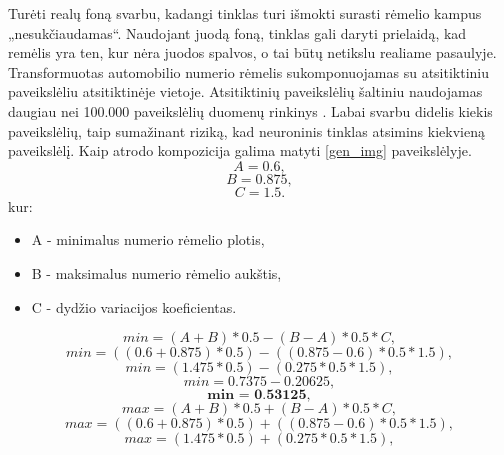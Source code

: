 \documentclass{VUMIFInfBakalaurinis}
\begin{document}
Turėti realų foną svarbu, kadangi tinklas turi išmokti surasti rėmelio kampus „nesukčiaudamas“. 
Naudojant juodą foną, tinklas gali daryti prielaidą, kad remėlis yra ten, kur nėra juodos spalvos, o tai būtų netikslu realiame pasaulyje.
Transformuotas automobilio numerio rėmelis sukomponuojamas su atsitiktiniu paveikslėliu atsitiktinėje vietoje.
Atsitiktinių paveikslėlių šaltiniu naudojamas daugiau nei 100.000 paveikslėlių duomenų rinkinys \cite{xiao2010sun}.
Labai svarbu didelis kiekis paveikslėlių, taip sumažinant riziką, kad neuroninis tinklas atsimins kiekvieną paveikslėlį.
Kaip atrodo kompozicija galima matyti \ref{gen_img} paveikslėlyje.
\begin{equation}
  A = 0.6,
\end{equation}
\begin{equation}
  B = 0.875,
\end{equation}
\begin{equation}
  C = 1.5.
\end{equation}
kur:
\begin{itemize}[itemsep=0.5pt]
  \item A - minimalus numerio rėmelio plotis,
  \item B - maksimalus numerio rėmelio aukštis,
  \item C - dydžio variacijos koeficientas.
\end{itemize}
\begin{equation}
  min = (A + B) * 0.5 - (B - A) * 0.5 * C,
\end{equation}
\begin{equation}
  min = ((0.6 + 0.875) * 0.5) - ((0.875 - 0.6) * 0.5 * 1.5),
\end{equation}
\begin{equation}
  min = (1.475 * 0.5) - (0.275 * 0.5 * 1.5),
\end{equation}
\begin{equation}
  min = 0.7375 - 0.20625,
\end{equation}
\begin{equation}
  \textbf{min = 0.53125},
\end{equation}
\begin{equation}
  max = (A + B) * 0.5 + (B - A) * 0.5 * C,
\end{equation}
\begin{equation}
  max = ((0.6 + 0.875) * 0.5) + ((0.875 - 0.6) * 0.5 * 1.5),
\end{equation}
\begin{equation}
  max = (1.475 * 0.5) + (0.275 * 0.5 * 1.5),
\end{equation}
\end{document}
